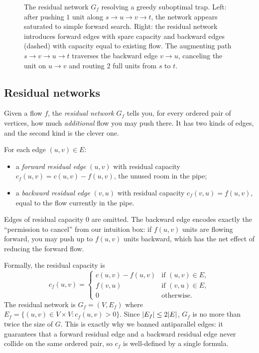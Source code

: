 \begin{figure}[H]
\caption{The residual network $G_f$ resolving a greedy suboptimal trap. Left: after pushing $1$ unit along $s \to u \to v \to t$, the network appears saturated to simple forward search. Right: the residual network introduces forward edges with spare capacity and backward edges (dashed) with capacity equal to existing flow. The augmenting path $s \to v \to u \to t$ traverses the backward edge $v \to u$, canceling the unit on $u \to v$ and routing $2$ full units from $s$ to $t$.}
\label{ch26:fig-diamond-residual}
\end{figure}

\subsection{Residual networks}
\label{ch26:residual}

Given a flow $f$, the \emph{residual network} $G_f$ tells you, for every
ordered pair of vertices, how much \emph{additional} flow you may push there. It
has two kinds of edges, and the second kind is the clever one.

For each edge $(u,v) \in E$:
\begin{itemize}
  \item a \emph{forward residual edge} $(u,v)$ with residual capacity
        $c_f(u,v) = c(u,v) - f(u,v)$, the unused room in the pipe;
  \item a \emph{backward residual edge} $(v,u)$ with residual capacity
        $c_f(v,u) = f(u,v)$, equal to the flow currently in the pipe.
\end{itemize}
Edges of residual capacity $0$ are omitted. The backward edge encodes
exactly the ``permission to cancel'' from our intuition box: if $f(u,v)$ units
are flowing forward, you may push up to $f(u,v)$ units backward, which has the
net effect of reducing the forward flow.

\begin{formalbox}
Formally, the residual capacity is
\[
  c_f(u,v) =
  \begin{cases}
    c(u,v) - f(u,v) & \text{if } (u,v) \in E,\\
    f(v,u) & \text{if } (v,u) \in E,\\
    0 & \text{otherwise.}
  \end{cases}
\]
The residual network is $G_f = (V, E_f)$ where
$E_f = \{(u,v) \in V \times V : c_f(u,v) > 0\}$. Since $\lvert E_f\rvert \le 2\lvert E\rvert$,
$G_f$ is no more than twice the size of $G$. This is exactly why we banned
antiparallel edges: it guarantees that a forward residual edge and a backward
residual edge never collide on the same ordered pair, so $c_f$ is
well-defined by a single formula.
\end{formalbox}

